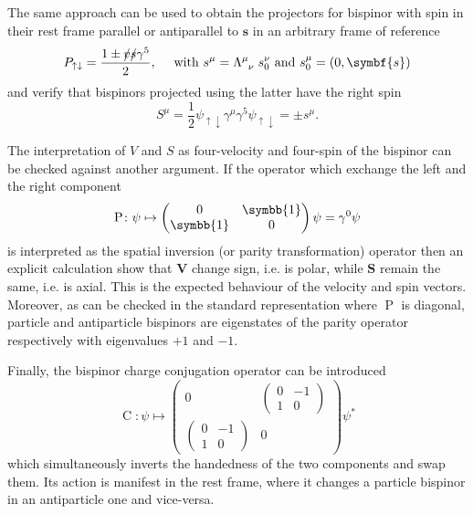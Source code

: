 The same approach can be used to obtain the projectors for bispinor with spin in their rest frame parallel or antiparallel to $\symbf{s}$ in an arbitrary frame of reference
\begin{equation}
  P_{\uparrow \downarrow} = \frac{1 \pm \slashed{v} \slashed{s} \gamma^5}{2} , \quad \text{ with } s^\mu = \Lambda\indices{^\mu_\nu} \; s_0^\nu \text{ and } s_0^\mu = (0, \symbf{s})
\end{equation}
and verify that bispinors projected using the latter have the right spin 
\begin{equation}
  S^\mu = \frac{1}{2} \psi_{\uparrow \downarrow} \gamma^\mu \gamma^5 \psi_{\uparrow \downarrow} = \pm s^\mu .
\end{equation}

The interpretation of $V$ and $S$ as four-velocity and four-spin of the bispinor can be checked against another argument. If the operator which exchange the left and the right component
\begin{equation}
  \operatorname{P} \colon \psi \mapsto \begin{pmatrix} 0 & \symbb{1} \\ \symbb{1} & 0 \end{pmatrix} \psi = \gamma^0 \psi
\end{equation}
is interpreted as the spatial inversion (or parity transformation) operator then an explicit calculation show that $\symbf{V}$ change sign, i.e. is polar, while $\symbf{S}$ remain the same, i.e. is axial. This is the expected behaviour of the velocity and spin vectors. Moreover, as can be checked in the standard representation where $\operatorname{P}$ is diagonal, particle and antiparticle bispinors are eigenstates of the parity operator respectively with eigenvalues $+1$ and $-1$.

Finally, the bispinor charge conjugation operator can be introduced
\begin{equation}
  \operatorname{C} \colon \psi \mapsto \begin{pmatrix} 0 & \begin{pmatrix} 0 & -1 \\ 1 & 0 \end{pmatrix} \\ \begin{pmatrix} 0 & -1 \\ 1 & 0 \end{pmatrix} & 0 \end{pmatrix} \psi^*
\end{equation}
which simultaneously inverts the handedness of the two components and swap them. Its action is manifest in the rest frame, where it changes a particle bispinor in an antiparticle one and vice-versa.

